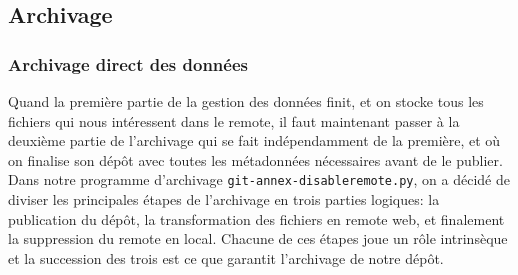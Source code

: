 \documentclass[11pt]{article}
\begin{document}
\subsection{Archivage}
\label{sec:orgb711879}
\subsubsection{Archivage direct des données}
\label{sec:org196cb3f}
Quand la première partie de la gestion des données finit, et on stocke
tous les fichiers qui nous intéressent dans le remote, il faut
maintenant passer à la deuxième partie de l'archivage qui se fait
indépendamment de la première, et où on finalise son dépôt avec toutes
les métadonnées nécessaires avant de le publier.
Dans notre programme d'archivage \texttt{git-annex-disableremote.py}, on a
décidé de diviser les principales étapes de l'archivage en trois
parties logiques: la publication du dépôt, la transformation des
fichiers en remote web, et finalement la suppression du remote en
local. Chacune de ces étapes joue un rôle intrinsèque et la succession
des trois est ce que garantit l'archivage de notre dépôt.
\end{document}
